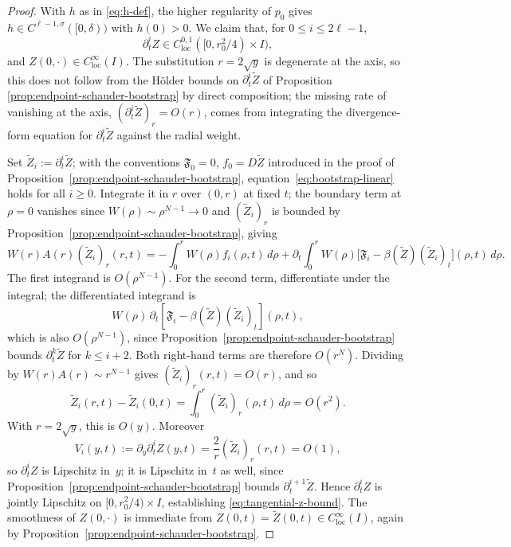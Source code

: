 \documentclass[10pt,a4paper]{amsart}
\newcommand{\dd}{\,d}
\newcommand{\loc}{\mathrm{loc}}
\begin{document}
\begin{proof}
With \(h\) as in \eqref{eq:h-def}, the higher regularity of \(p_0\) gives
\(h\in C^{\ell-1,\sigma}([0,\delta))\) with \(h(0)>0\). We claim that, for
\(0\le i\le2\ell-1\),
\begin{equation}
\label{eq:tangential-z-bound}
        \partial_t^i Z\in C^{0,1}_{\loc}([0,r_0^2/4)\times I),
\end{equation}
and \(Z(0,\cdot)\in C^\infty_{\loc}(I)\). The substitution \(r=2\sqrt y\)
is degenerate at the axis, so this does not follow from the H\"older
bounds on \(\partial_t^i\widetilde Z\) of Proposition
\ref{prop:endpoint-schauder-bootstrap} by direct composition; the missing
rate of vanishing at the axis, \((\partial_t^i\widetilde Z)_r=O(r)\), comes from integrating the
divergence-form equation for \(\partial_t^i\widetilde Z\) against the radial weight.

Set \(\widetilde Z_i:=\partial_t^i\widetilde Z\); with the conventions
\(\mathfrak F_0=0\), \(f_0=D\widetilde Z\) introduced in the proof of
Proposition~\ref{prop:endpoint-schauder-bootstrap},
equation~\eqref{eq:bootstrap-linear} holds for all \(i\ge0\). Integrate
it in \(r\) over \((0,r)\) at fixed \(t\); the boundary term at
\(\rho=0\) vanishes since \(W(\rho)\sim\rho^{N-1}\to0\) and
\((\widetilde Z_i)_r\) is bounded by
Proposition~\ref{prop:endpoint-schauder-bootstrap}, giving
\[
        W(r)A(r)(\widetilde Z_i)_r(r,t)
        =-\int_0^rW(\rho)f_i(\rho,t)\dd\rho
        +\partial_t\!\int_0^rW(\rho)\bigl[\mathfrak F_i-\beta(\widetilde Z)(\widetilde Z_i)_t\bigr](\rho,t)\dd\rho .
\]
The first integrand is \(O(\rho^{N-1})\). For the second term, differentiate
under the integral; the differentiated integrand is
\[
        W(\rho)\,\partial_t\!\left[
        \mathfrak F_i-\beta(\widetilde Z)(\widetilde Z_i)_t
        \right](\rho,t),
\]
which is also \(O(\rho^{N-1})\), since
Proposition~\ref{prop:endpoint-schauder-bootstrap} bounds
\(\partial_t^k\widetilde Z\) for \(k\le i+2\). Both right-hand terms are therefore
\(O(r^N)\). Dividing by \(W(r)A(r)\sim r^{N-1}\) gives \((\widetilde Z_i)_r(r,t)=O(r)\),
and so
\[
        \widetilde Z_i(r,t)-\widetilde Z_i(0,t)
        =\int_0^r(\widetilde Z_i)_r(\rho,t)\dd\rho
        =O(r^2) .
\]
With \(r=2\sqrt y\), this is \(O(y)\). Moreover
\begin{equation}
\label{eq:Vi-bounded}
        V_i(y,t):=\partial_y\partial_t^iZ(y,t)
        =\frac2r(\widetilde Z_i)_r(r,t)=O(1),
\end{equation}
so \(\partial_t^iZ\) is Lipschitz in~\(y\); it is Lipschitz in~\(t\) as
well, since Proposition~\ref{prop:endpoint-schauder-bootstrap} bounds
\(\partial_t^{i+1}\widetilde Z\). Hence \(\partial_t^iZ\) is jointly Lipschitz on
\([0,r_0^2/4)\times I\), establishing \eqref{eq:tangential-z-bound}. The
smoothness of \(Z(0,\cdot)\) is immediate from
\(Z(0,t)=\widetilde Z(0,t)\in C^\infty_{\loc}(I)\), again by
Proposition~\ref{prop:endpoint-schauder-bootstrap}.


\end{proof}
\end{document}
